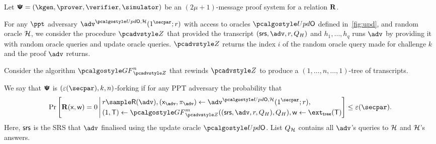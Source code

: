 \begin{definition}
	Let $\proofsystem = (\kgen, \prover, \verifier, \simulator)$ be an
	$(2 \mu + 1)$-message proof system for a relation $\mathbf{R}$.
	
	For any $\ppt$ adversary $\advse^{\initU,
		\ro} (1^\secpar; r)$ with access to oracles $\initU$ defined in~\cref{fig:upd}, and random oracle $\mathcal{H}$, we consider the procedure $\zdv$ that provided the transcript $(\srs, \adv, r, Q_H)$ and $h_1, \ldots, h_q$ runs $\adv$ by providing it with random oracle queries
	and update oracle queries.
	$\zdv$ returns the index $i$ of the
	random oracle query made for challenge $k$ and the proof $\adv$ returns.
	
	Consider the algorithm $\genforking_{\zdv}^{n}$
	that rewinds $\zdv$ to produce a $(1,\dots, n,\dots, 1)$-tree of
	transcripts.
	
	We say that $\bm{\mathsf{\Psi}}$ is $(\eps(\secpar), k,n)$-forking if
	for any PPT adversary the probability that
	\begin{align*}
	\Pr\left[
	\REL(\inp, \wit) = 0
	\,\Biggl|\,
	\begin{aligned}
	& r \sample \RND{\advse},
	(\inp_{\advse}, \zkproof_{\advse}) \gets \advse^{\initU, \ro} (1^\secpar; r), \\
	&    (1, \tree) \gets \genforking_{\zdv}^{m}((\srs,\adv,r, Q_{H}),Q_{H}),
	\wit \gets \extt(\tree)
	\end{aligned}
	\right] \leq \eps(\secpar).
	\end{align*}
	Here, $\mathsf{srs}$ is the SRS that $\advse$ finalised using the update oracle $\initU$.
	List $Q_{\mathcal{H}}$ contains all $\advse$'s
	queries to $\mathcal{H}$ and $\mathcal{H}$'s answers. 
\end{definition}

